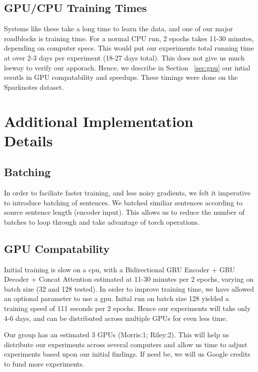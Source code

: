 \documentclass[twoside,twocolumn]{article}
\begin{document}
\subsection{GPU/CPU Training Times}
Systems like these take a long time to learn the data, and one of our major
roadblocks is training time. For a normal CPU run, 2 epochs takes 11-30 minutes,
depending on computer specs. This would put our experiments total running time
at over 2-3 days per experiment (18-27 days total). This does not give us much
leeway to verify our
apporach. Hence, we describe in Section ~\ref{sec:gpu} our intial resutls
in GPU compatability and speedups. These timings were done on the Sparknotes
dataset.


\section{Additional Implementation\\Details}
\subsection{Batching}
In order to faciliate faster training, and less noisy gradients, we felt it
imperative to introduce batching of sentences. We batched similiar sentences
according to source sentence length (encoder input). This allows us to reduce
the number of batches to loop through and take advantage of torch operations.

\subsection{GPU Compatability}
Initial training is slow on a cpu, with a Bidirectional GRU Encoder
+ GRU Decoder + Concat Attention estimated at 11-30 minutes per 2 epochs,
varying on batch size (32 and 128 tested). In order to improve training time,
we have allowed an optional parameter to use a gpu. Inital run on batch size 128
yielded a training speed of 111 seconds per 2 epochs. Hence our experiments will
take only 4-6 days, and can be distributed across multiple GPUs for even less
time.

Our group has an estimated 3 GPUs (Morris:1; Riley:2). This will help us
distribute our experiments across several computers and allow us time to adjust
experiments based upon our initial findings. If need be, we will us Google
credits to fund more experiments.
\end{document}
